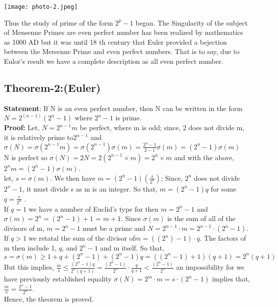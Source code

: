 \documentclass[12pt,,a4paper]{book}
\begin{document}
\begin{center}
    \texttt{[image: photo-2.jpeg]}
\end{center}

 Thus the study of prime of the form \(2^{p}-1\) began. The Singularity of the subject of Mensenne Primes are even perfect number has been realized by mathematics as 1000 AD but it was until 18 th century that Euler provided a bejection between the Mersenne Prime and even perfect numbers. That is to say, due to Eulor's result we have a complete description as all even perfect number. \\ \vspace{20pt}

\subsection{Theorem-2:(Euler)} 
\textbf{Statement}: If N is an even perfect number, then N
can be written in the form \(N = 2^{(n-1)}(2^n-1)\) where \hspace{0.2cm} \(2^{n}-1\) is prime. \\ \vspace{10pt}
\textbf{Proof:}
 Let, \(N = 2^{n-1}m\) be perfect, where m is odd; since, 2  does not divide m, it is relatively prime to\(2^{n-1}\) and  \(\sigma(N) = \sigma(2^{n-1}m) = \sigma(2^{n-1})\sigma(m) = \frac{{2^n-1}}{{2-1}} \sigma(m) = (2^n-1) \sigma(m)\)  \\
 N is perfect so \(\sigma(N) = 2N = 2(2^{n-1} \times m) = 2^n \times m\) and with the above, 
\(2^n m = (2^n-1) \sigma (m)\). \\
 let, \(s=\sigma(m)\). We then have \(m=(2^n-1) \left(\frac{s}{2^n}\right)\); Since, \(2^n\) does not divide \(2^{n}-1\), it must divide s as m is an integer. So that, \(m = (2^n-1)q\) for some \(q = \frac{s}{2^n}\) . \\
If \(q = 1\) we have a number of Euclid's type for then \(m = 2^n - 1\) and \(\sigma(m) = 2^n = (2^{n}-1)+1\) = \(m+1\).
 Since \(\sigma(m)\) is the sum of all of the divisors of m, \(m = 2^{n}-1\)  must be a prime and \(N = 2^{n-1} \cdot m = 2^{n-1} \cdot (2^n-1)\). \\
 If \(q > 1\) we retatal the sum of the divisor of\(m = ((2^n) - 1) \cdot q\). The factors of m then include 1, \(q\), and \(2^n - 1\) and m itself. So that, \\
 \(s = \sigma(m) \geq 1 + q+(2^n-1)+(2^n-1)q =((2^n-1) +1)(q+1) = 2^n(q+1)\)\\
 But this implies, 
\(\frac{m}{s} \leq \frac{(2^n-1)q}{2^n(q+1)} = \frac{(2^n -1)}{2^n} \cdot \frac{q}{q+1} < \frac{(2^n -1)}{2^n}\) an impossibility  for we have  previously established equality \(\sigma(N) = 2^m \cdot m = s \cdot (2^n-1)\) implies that, \(\frac{m}{s} = \frac{2^n-1}{2^n}\). \\ Hence, the theorem is proved. \\ 
\vspace{10pt}
\end{document}
